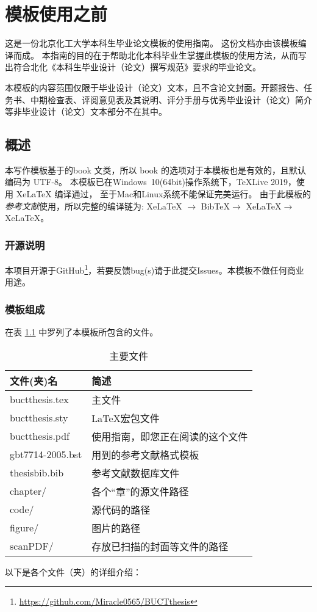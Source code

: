 \chapter{模板使用之前}
这是一份北京化工大学本科生毕业论文模板的使用指南。
这份文档亦由该模板编译而成。
本指南的目的在于帮助北化本科毕业生掌握此模板的使用方法，从而写出符合北化《本科生毕业设计（论文）撰写规范》要求的毕业论文。

本模板的内容范围仅限于毕业设计（论文）文本，且不含论文封面。开题报告、任务书、中期检查表、评阅意见表及其说明、评分手册与优秀毕业设计（论文）简介等非毕业设计（论文）文本部分不在其中。

	\section{概述}
	本写作模板基于\CTeX{}的book 文类，所以 book 的选项对于本模板也是有效的，且默认编码为 UTF-8。
	本模板已在Windows\ 10(64bit)操作系统下，\TeX{}Live 2019，使用 XeLaTeX 编译通过，
	至于Mac和Linux系统不能保证完美运行。
	由于此模板的\emph{参考文献}使用\BibTeX{}，所以完整的编译链为:
	XeLaTeX $\rightarrow$ BibTeX{}$\rightarrow$ XeLaTeX{}$\rightarrow$ XeLaTeX{}。
		\subsection{开源说明}
			本项目开源于GitHub\footnote{\url{https://github.com/Miracle0565/BUCTthesis}}，若要反馈bug(s)请于此提交Issues。本模板不做任何商业用途。
		\subsection{模板组成}
		在表 \ref{tab:mainfile} 中罗列了本模板所包含的文件。
		\begin{table}%
			\centering
			\caption{主要文件}
			\label{tab:mainfile}
			\begin{tabular}{ll}
				\hline 
				文件(夹)名 & 简述 \\ 
				\hline 
				\textsf{buctthesis.tex} & 主文件 \\
				\textsf{buctthesis.sty} & \LaTeX{}宏包文件\\
				\textsf{buctthesis.pdf} & 使用指南，即您正在阅读的这个文件\\
				\textsf{gbt7714-2005.bst} & \BibTeX{}用到的参考文献格式模板\\
				\textsf{thesisbib.bib}		& \BibTeX{}参考文献数据库文件\\
				\textsf{chapter/} & 各个“章”的源文件路径\\
				\textsf{code/} & 源代码的路径\\
				\textsf{figure/} & 图片的路径\\
				\textsf{scanPDF/} & 存放已扫描的封面等文件的路径\\
				\hline 
			\end{tabular} 
		\end{table}
		以下是各个文件（夹）的详细介绍：
